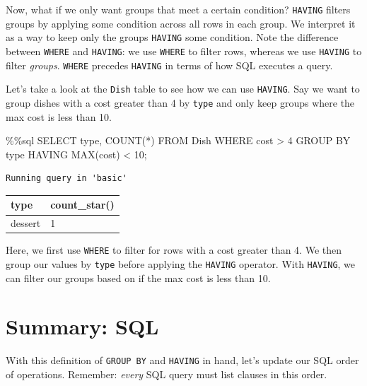\documentclass[
  letterpaper,
  DIV=11,
  numbers=noendperiod]{scrreprt}
\newenvironment{Shaded}{\begin{snugshade}}{\end{snugshade}}
\newcommand{\BuiltInTok}[1]{\textcolor[rgb]{0.00,0.23,0.31}{#1}}
\newcommand{\DecValTok}[1]{\textcolor[rgb]{0.68,0.00,0.00}{#1}}
\newcommand{\NormalTok}[1]{\textcolor[rgb]{0.00,0.23,0.31}{#1}}
\newcommand{\OperatorTok}[1]{\textcolor[rgb]{0.37,0.37,0.37}{#1}}
\begin{document}
Now, what if we only want groups that meet a certain condition?
\texttt{HAVING} filters groups by applying some condition across all
rows in each group. We interpret it as a way to keep only the groups
\texttt{HAVING} some condition. Note the difference between
\texttt{WHERE} and \texttt{HAVING}: we use \texttt{WHERE} to filter
rows, whereas we use \texttt{HAVING} to filter \emph{groups}.
\texttt{WHERE} precedes \texttt{HAVING} in terms of how SQL executes a
query.

Let's take a look at the \texttt{Dish} table to see how we can use
\texttt{HAVING}. Say we want to group dishes with a cost greater than 4
by \texttt{type} and only keep groups where the max cost is less than
10.

\begin{Shaded}
\begin{Highlighting}[]
\OperatorTok{\%\%}\NormalTok{sql}
\NormalTok{SELECT }\BuiltInTok{type}\NormalTok{, COUNT(}\OperatorTok{*}\NormalTok{)}
\NormalTok{FROM Dish}
\NormalTok{WHERE cost }\OperatorTok{\textgreater{}} \DecValTok{4}
\NormalTok{GROUP BY }\BuiltInTok{type}
\NormalTok{HAVING MAX(cost) }\OperatorTok{\textless{}}  \DecValTok{10}\OperatorTok{;}
\end{Highlighting}
\end{Shaded}

\begin{verbatim}
Running query in 'basic'
\end{verbatim}

\begin{longtable}[]{@{}ll@{}}
\toprule\noalign{}
type & count\_star() \\
\midrule\noalign{}
\endhead
\bottomrule\noalign{}
\endlastfoot
dessert & 1 \\
\end{longtable}

Here, we first use \texttt{WHERE} to filter for rows with a cost greater
than 4. We then group our values by \texttt{type} before applying the
\texttt{HAVING} operator. With \texttt{HAVING}, we can filter our groups
based on if the max cost is less than 10.

\section{Summary: SQL}\label{summary-sql}

With this definition of \texttt{GROUP\ BY} and \texttt{HAVING} in hand,
let's update our SQL order of operations. Remember: \emph{every} SQL
query must list clauses in this order.
\end{document}
